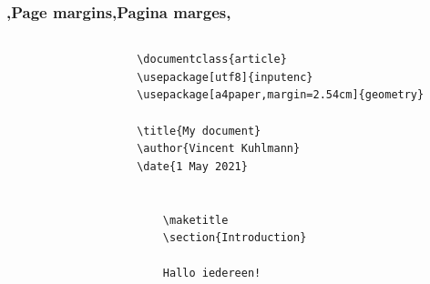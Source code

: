 \begin{frame}[fragile]
    \frametitle{\lang,Page margins,Pagina marges,}
    \begin{columns}
        \begin{column}{0.67\textwidth}
            \begin{codebox}
                \begin{verbatim}
                    \documentclass{article}
                    \usepackage[utf8]{inputenc}
                    \usepackage[a4paper,margin=2.54cm]{geometry}
                    
                    \title{My document}
                    \author{Vincent Kuhlmann}
                    \date{1 May 2021}
                    
                    
                        \maketitle
                        \section{Introduction}
                        
                        Hallo iedereen!
                    

\end{verbatim}
\end{codebox}
\end{column}
\end{columns}
\end{frame}
